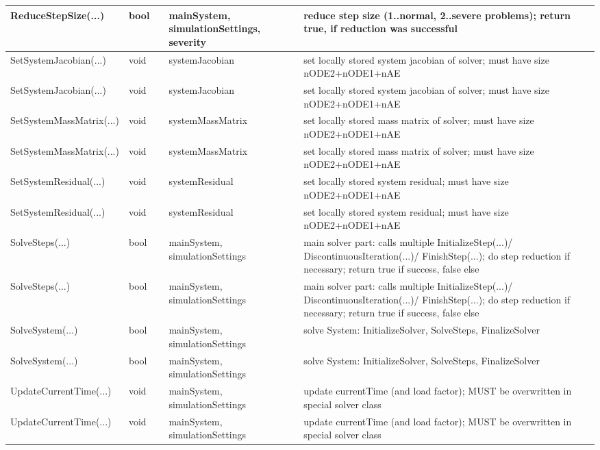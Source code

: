 \begin{center}
\begin{longtable}{| p{4.2cm} | p{2.5cm} | p{0.3cm} | p{3.0cm} | p{6cm} |}
    ReduceStepSize(...) &     bool &      &     mainSystem, simulationSettings, severity &     reduce step size (1..normal, 2..severe problems); return true, if reduction was successful\\ \hline
    SetSystemJacobian(...) &     void &      &     systemJacobian &     set locally stored system jacobian of solver; must have size nODE2+nODE1+nAE\\ \hline
    SetSystemJacobian(...) &     void &      &     systemJacobian &     set locally stored system jacobian of solver; must have size nODE2+nODE1+nAE\\ \hline
    SetSystemMassMatrix(...) &     void &      &     systemMassMatrix &     set locally stored mass matrix of solver; must have size nODE2+nODE1+nAE\\ \hline
    SetSystemMassMatrix(...) &     void &      &     systemMassMatrix &     set locally stored mass matrix of solver; must have size nODE2+nODE1+nAE\\ \hline
    SetSystemResidual(...) &     void &      &     systemResidual &     set locally stored system residual; must have size nODE2+nODE1+nAE\\ \hline
    SetSystemResidual(...) &     void &      &     systemResidual &     set locally stored system residual; must have size nODE2+nODE1+nAE\\ \hline
    SolveSteps(...) &     bool &      &     mainSystem, simulationSettings &     main solver part: calls multiple InitializeStep(...)/ DiscontinuousIteration(...)/ FinishStep(...); do step reduction if necessary; return true if success, false else\\ \hline
    SolveSteps(...) &     bool &      &     mainSystem, simulationSettings &     main solver part: calls multiple InitializeStep(...)/ DiscontinuousIteration(...)/ FinishStep(...); do step reduction if necessary; return true if success, false else\\ \hline
    SolveSystem(...) &     bool &      &     mainSystem, simulationSettings &     solve System: InitializeSolver, SolveSteps, FinalizeSolver\\ \hline
    SolveSystem(...) &     bool &      &     mainSystem, simulationSettings &     solve System: InitializeSolver, SolveSteps, FinalizeSolver\\ \hline
    UpdateCurrentTime(...) &     void &      &     mainSystem, simulationSettings &     update currentTime (and load factor); MUST be overwritten in special solver class\\ \hline
    UpdateCurrentTime(...) &     void &      &     mainSystem, simulationSettings &     update currentTime (and load factor); MUST be overwritten in special solver class\\ \hline

\end{longtable}
\end{center}
